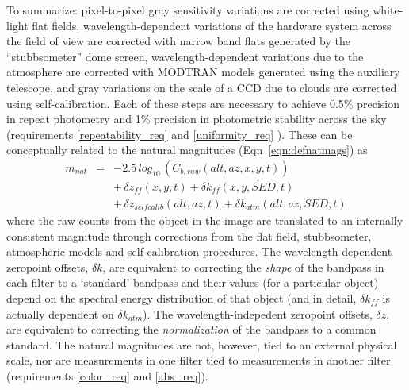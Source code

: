 \documentclass[12pt,preprint]{aastex}
\begin{document}
To summarize: pixel-to-pixel gray sensitivity variations are corrected
using white-light flat fields, wavelength-dependent
variations of the hardware system across the field of view are
corrected with narrow band flats generated by the ``stubbsometer''
dome screen, wavelength-dependent variations due to the atmosphere are
corrected with MODTRAN models generated using the auxiliary telescope,
and gray variations on the scale of a CCD due to clouds are corrected
using self-calibration. Each of these steps are necessary to achieve
0.5\% precision in repeat photometry and 1\% precision in photometric
stability across the sky (requirements \ref{repeatability_req} and
\ref{uniformity_req} ). These can be conceptually related to the natural magnitudes
(Eqn~\ref{eqn:defnatmags})  as 
\begin{eqnarray}
\label{eqn:defnatmags2}
m_{nat} & = &-2.5 \, log_{10} \, (C_{b, raw}(alt,az,x,y,t))  \\ 
 & & +\, \delta z_{ff}(x,y,t) + \delta k_{ff}(x,y,SED,t)  \nonumber \\  
 & &+\, \delta z_{selfcalib}(alt,az,t)  + \delta k_{atm}(alt,az,SED,t)  \nonumber
\end{eqnarray}
where the raw counts from the object in the image are translated to an
internally consistent magnitude through corrections from the flat
field, stubbsometer, atmospheric models and self-calibration
procedures. The wavelength-dependent zeropoint offsets, $\delta k$, are
equivalent to correcting the {\it shape} of the bandpass in each
filter to a `standard' bandpass and their values (for a particular object) 
depend on the spectral energy distribution of that object (and in detail, $\delta k_{ff}$ is actually
dependent on $\delta k_{atm}$). The wavelength-indepedent
zeropoint offsets, $\delta z$, are equivalent to
correcting the {\it normalization} of the bandpass to a common
standard.  The natural magnitudes are not, however, tied to an
external physical scale, nor are measurements in one filter tied to
measurements in another filter (requirements \ref{color_req} and
\ref{abs_req}).
\end{document}
